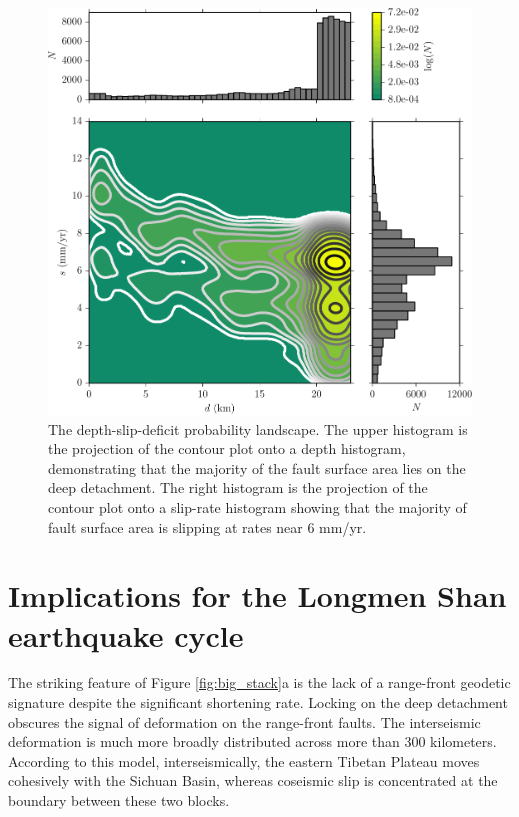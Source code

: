 \documentclass[12pt]{article}
\begin{document}
\begin{figure}[h!]
    \centering
    \includegraphics{figs/depth_slip_contour.pdf}
    \caption{The depth-slip-deficit probability landscape. The upper histogram is the projection of the contour plot onto a depth histogram, demonstrating that the majority of the fault surface area lies on the deep detachment. The right histogram is the projection of the contour plot onto a slip-rate histogram showing that the majority of fault surface area is slipping at rates near 6 mm/yr.}
    \label{fig:distribution}
\end{figure}

\section{Implications for the Longmen Shan earthquake cycle}
The striking feature of Figure \ref{fig:big_stack}a is the lack of a range-front geodetic signature despite the significant shortening rate. Locking on the deep detachment obscures the signal of deformation on the range-front faults. The interseismic deformation is much more broadly distributed across more than 300 kilometers. According to this model, interseismically, the eastern Tibetan Plateau moves cohesively with the Sichuan Basin, whereas coseismic slip is concentrated at the boundary between these two blocks.
\end{document}
